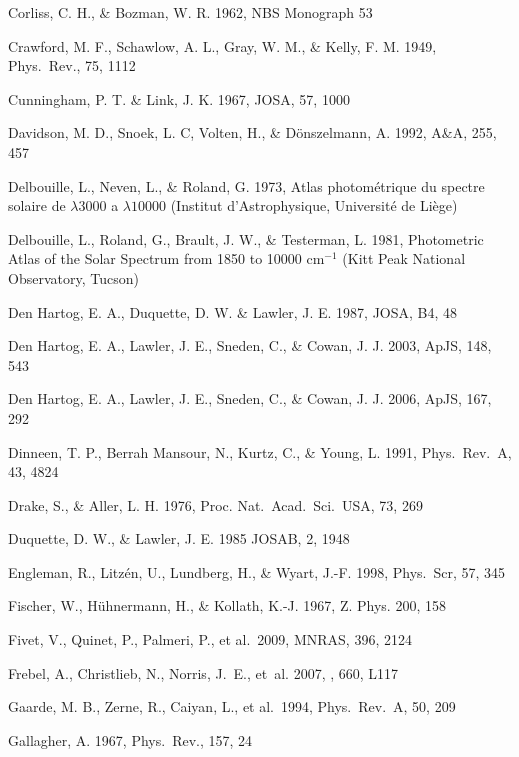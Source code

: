 \documentclass[traditabstract]{aa}
\begin{document}
\begin{thebibliography}{}
  Corliss, C. H., \& Bozman, W. R. 1962, NBS Monograph 53

  Crawford, M. F., Schawlow, A. L., Gray, W. M., \& Kelly, F. M. 1949, Phys.\ Rev., 75, 1112

  Cunningham, P. T. \& Link, J. K. 1967, JOSA, 57, 1000

  Davidson, M. D., Snoek, L. C, Volten, H., \& D\"onszelmann, A. 1992, A\&A, 255, 457

  Delbouille, L., Neven, L., \& Roland, G. 1973, Atlas photom{\'e}trique du spectre solaire de $\lambda 3000$ a $\lambda 10000$ (Institut d'Astrophysique, Universit\'e de Li\`ege)

  Delbouille, L., Roland, G., Brault, J. W., \& Testerman, L. 1981, Photometric Atlas of the Solar Spectrum from 1850 to 10000 cm$^{-1}$ (Kitt Peak National Observatory, Tucson)

  Den Hartog, E. A., Duquette, D. W. \& Lawler, J. E. 1987, JOSA, B4, 48

  Den Hartog, E. A., Lawler, J. E., Sneden, C., \& Cowan, J. J. 2003, ApJS, 148, 543

  Den Hartog, E. A., Lawler, J. E., Sneden, C., \& Cowan, J. J. 2006, ApJS, 167, 292

  Dinneen, T. P., Berrah Mansour, N., Kurtz, C., \& Young, L. 1991, Phys.\ Rev.\ A, 43, 4824

  Drake, S., \& Aller, L. H. 1976, Proc. Nat.\ Acad.\ Sci.\ USA, 73, 269

  Duquette, D. W., \& Lawler, J. E. 1985 JOSAB, 2, 1948

  Engleman, R., Litz\'en, U., Lundberg, H., \& Wyart, J.-F. 1998, Phys.\ Scr, 57, 345

  Fischer, W., H\"{u}hnermann, H., \& Kollath, K.-J. 1967, Z. Phys. 200, 158

  Fivet, V., Quinet, P., Palmeri, P., et al.\ 2009, MNRAS, 396, 2124

  {Frebel}, A., {Christlieb}, N., {Norris}, J.~E., {et~al.} 2007, \apjl, 660, L117

  Gaarde, M. B., Zerne, R., Caiyan, L., et al.\ 1994, Phys.\ Rev.\ A, 50, 209

  Gallagher, A. 1967, Phys.\ Rev., 157, 24


\end{thebibliography}
\end{document}
